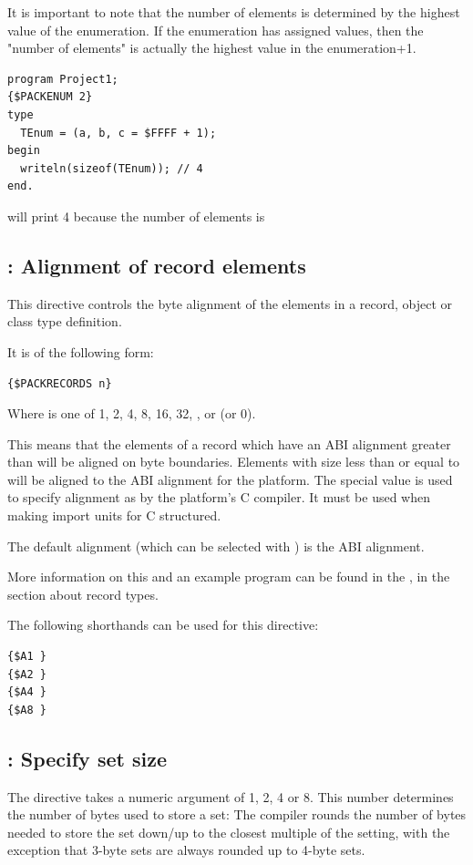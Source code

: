 It is important to note that the number of elements is determined by the
highest value of the enumeration. If the enumeration has assigned values, then
the "number of elements" is actually the highest value in the enumeration+1.
\begin{verbatim}
program Project1;
{$PACKENUM 2}
type
  TEnum = (a, b, c = $FFFF + 1);
begin
  writeln(sizeof(TEnum)); // 4
end.
\end{verbatim}
will print 4 because the number of elements is 


\subsection{ : Alignment of record elements}
\label{se:Packrecords}
This directive controls the byte alignment of the elements in a record,
object or class type definition. 

It is of the following form:
\begin{verbatim}
{$PACKRECORDS n}
\end{verbatim}

Where  is one of 1, 2, 4, 8, 16, 32, ,  or  (or 0).

This means that the elements of a record which have an ABI alignment greater than 
will be aligned on  byte boundaries. 
Elements with size less than or equal to  will be aligned to the ABI alignment for the platform.
The special value   is used to specify alignment as by the platform's C compiler. 
It must be used when making import units for C structured.

The default alignment (which can be selected with ) is the ABI
alignment.

More information on this and an example program can be found in the ,
in the section about record types.

The following shorthands can be used for this directive:
\begin{verbatim}
{$A1 }
{$A2 }
{$A4 }
{$A8 }
\end{verbatim}

\subsection{ : Specify set size}
\label{se:Packset}
The  directive takes a numeric argument of 1, 2, 4 or 8.
This number determines the number of bytes used to store a set: 
The compiler rounds the number of bytes needed to store the set 
down/up to the closest multiple of the  setting, 
with the exception that 3-byte sets are always rounded up to 4-byte 
sets.

